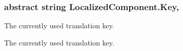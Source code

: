 \subsubsection[{\texorpdfstring{Key}{Key}}]{\setlength{\rightskip}{0pt plus 5cm}abstract string Localized\+Component.\+Key\hspace{0.3cm}{\ttfamily [get]}, {\ttfamily [set]}}\hypertarget{class_localized_component_a5672af523f3b1f50544b918daa719405}{}\label{class_localized_component_a5672af523f3b1f50544b918daa719405}


The currently used translation key. 

The currently used translation key.